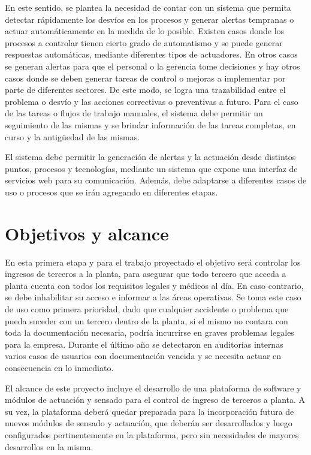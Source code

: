 En este sentido, se plantea la necesidad de contar con un sistema que permita detectar rápidamente los desvíos en los procesos y generar alertas tempranas o actuar automáticamente en la medida de lo posible. Existen casos donde los procesos a controlar tienen cierto grado de automatismo y se puede generar respuestas automáticas, mediante diferentes tipos de actuadores. En otros casos se generan alertas para que el personal o la gerencia tome decisiones y hay otros casos donde se deben generar tareas de control o mejoras a implementar por parte de diferentes sectores. De este modo, se logra una trazabilidad entre el problema o desvío y las acciones correctivas o preventivas a futuro. Para el caso de las tareas o flujos de trabajo manuales, el sistema debe permitir un seguimiento de las mismas y se brindar información de las tareas completas, en curso y la antigüedad de las mismas.

El sistema debe permitir la generación de alertas y la actuación desde distintos puntos, procesos y tecnologías, mediante un sistema que expone una interfaz de servicios web para su comunicación. Además, debe adaptarse a diferentes casos de uso o procesos que se irán agregando en diferentes etapas.


\section{Objetivos y alcance}

En esta primera etapa y para el trabajo proyectado el objetivo será controlar los ingresos de terceros a la planta, para asegurar que todo tercero que acceda a planta cuenta con todos los requisitos legales y médicos al día. En caso contrario, se debe inhabilitar su acceso e informar a las áreas operativas. Se toma este caso de uso como primera prioridad, dado que cualquier accidente o problema que pueda suceder con un tercero dentro de la planta, si el mismo no contara con toda la documentación necesaria, podría incurrirse en graves problemas legales para la empresa. Durante el último año se detectaron en auditorías internas varios casos de usuarios con documentación vencida y se necesita actuar en consecuencia en lo inmediato.

El alcance de este proyecto incluye el desarrollo de una plataforma de software y módulos de actuación y sensado para el control de ingreso de terceros a planta. A su vez, la plataforma deberá quedar preparada para la incorporación futura de nuevos módulos de sensado y actuación, que deberán ser desarrollados y luego configurados pertinentemente en la plataforma, pero sin necesidades de mayores desarrollos en la misma.

